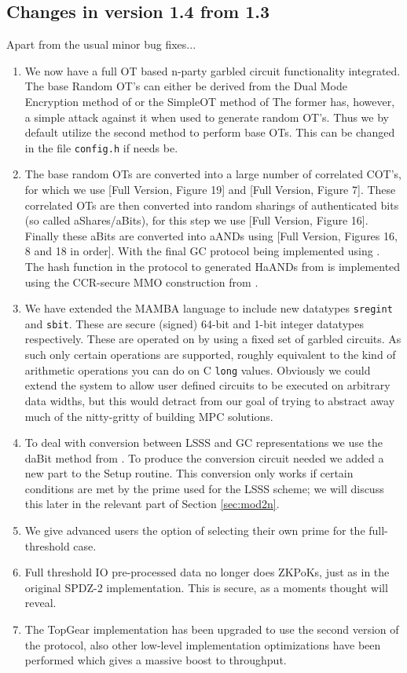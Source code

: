 \subsection{Changes in version 1.4 from 1.3}
Apart from the usual minor bug fixes...
\begin{enumerate}
\item We now have a full OT based n-party garbled circuit functionality
integrated. The base Random OT's can either be
derived from the Dual Mode Encryption method of \cite{PVW08}
or the SimpleOT method of \cite{CO15}
The former has, however, a simple attack against it when used to
generate random OT's. Thus we by default utilize the
second method to perform base OTs. This can be changed in
the file \verb+config.h+ if needs be.
\item The base random OTs are  converted into a large number of
correlated COT's, for which we use \cite{AC:FKOS15}[Full Version, Figure 19]
and \cite{C:KelOrsSch15}[Full Version, Figure 7].
These correlated OTs are then converted into random sharings of authenticated
bits (so called aShares/aBits), for this step we use \cite{AC:HazSchSor17}[Full Version, Figure 16].
Finally these aBits are converted into aANDs using
\cite{CCS:WanRanKat17b}[Full Version, Figures 16, 8 and 18 in order].
With the final GC protocol being implemented using \cite{AC:HazSchSor17}.
The hash function in the protocol to generated HaANDs from \cite{CCS:WanRanKat17b}
is implemented using the CCR-secure MMO construction from \cite{GKWY19}.
\item We have extended the MAMBA language to include new datatypes
\verb+sregint+ and \verb+sbit+. These are secure (signed)
64-bit and 1-bit integer datatypes respectively.
These are operated on by using a fixed
set of garbled circuits. As such only certain operations are supported,
roughly equivalent to the kind of arithmetic operations you can
do on C \verb+long+ values. Obviously we could extend the system to
allow user defined circuits to be executed on arbitrary data widths,
but this would detract from our goal of trying to abstract away
much of the nitty-gritty of building MPC solutions.
\item To deal with conversion between LSSS and GC representations
we use the daBit method from \cite{daBitPaper}.
To produce the conversion circuit needed we added a new part to the
Setup routine.
This conversion only works if certain conditions are met by the
prime used for the LSSS scheme; we will discuss this later
in the relevant part of Section \ref{sec:mod2n}.
\item We give advanced users the option of selecting their own
prime for the full-threshold case.
\item Full threshold IO pre-processed data no longer does ZKPoKs,
just as in the original SPDZ-2 implementation. This is secure,
as a moments thought will reveal.
\item The TopGear implementation has been upgraded to use the second
version of the protocol, also other low-level implementation optimizations
have been performed which gives a massive boost to throughput.
\end{enumerate}

